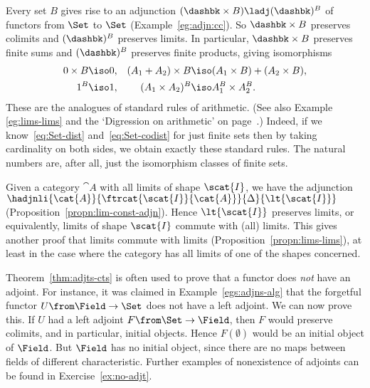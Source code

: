 \begin{example}
\label{eg:arith-set}
Every set $B$ gives rise to an adjunction $(\dashbk \times B) \ladj
(\dashbk)^B$ of functors from $\Set$ to $\Set$ (Example~\ref{eg:adjn:cc}).  So
$\dashbk \times B$ preserves colimits  and
$(\dashbk)^B$ preserves limits.  In particular, $\dashbk \times B$ preserves
finite sums and $(\dashbk)^B$ preserves finite products, giving isomorphisms
% 
\begin{align}
\label{eq:Set-dist}
0 \times B &\iso 0,
&
(A_1 + A_2) \times B &\iso (A_1 \times B) + (A_2 \times B),      \\
\label{eq:Set-codist}
1^B &\iso 1,
&
(A_1 \times A_2)^B &\iso A_1^B \times A_2^B.
\end{align}
% 
These are the analogues of standard rules of arithmetic.%
%
%
(See also Example \ref{eg:lims-lims} and the `Digression on arithmetic' on
page~\pageref{p:arith}.)  Indeed, if we know~\eqref{eq:Set-dist}
and~\eqref{eq:Set-codist} for just finite sets then by taking cardinality
on both sides, we obtain exactly these standard rules.  The natural%
%
%
numbers are, after all, just the isomorphism classes of finite sets.
\end{example}

\begin{example}
Given a category $\cat{A}$ with all limits of shape $\scat{I}$, we have the
adjunction
$\hadjnli{\cat{A}}{\ftrcat{\scat{I}}{\cat{A}}}{\Delta}{\lt{\scat{I}}}$
(Proposition~\ref{propn:lim-const-adjn}).  Hence $\lt{\scat{I}}$ preserves
limits, or equivalently, limits of shape $\scat{I}$ commute with (all)
limits.  This gives another proof that limits commute%
%
%
with limits (Proposition~\ref{propn:lims-lims}), at least in the case where
the category has all limits of one of the shapes concerned.
\end{example}

\begin{example} 
\label{eg:no-free-field}
Theorem~\ref{thm:adjts-cts} is often used to prove that a functor does
\emph{not}%
%
%
have an adjoint.  For instance, it was claimed in
Example~\ref{egs:adjns-alg} that the forgetful
functor $U\from \Field \to \Set$%
%
%
does not have a left adjoint.  We can now prove this.  If $U$ had a left
adjoint $F\from \Set \to \Field$, then $F$ would preserve colimits, and in
particular, initial objects.  Hence $F(\emptyset)$ would be an initial
object of $\Field$.  But $\Field$ has no initial object, since there are no
maps between fields of different characteristic.  Further examples of
nonexistence of adjoints can be found in Exercise~\ref{ex:no-adjt}.
\end{example}


